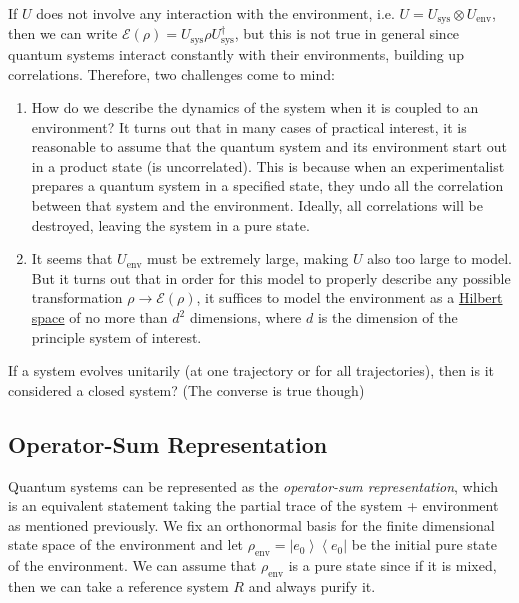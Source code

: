 \documentclass{article}
\newcommand{\ket}[1]{\ensuremath{\left|#1\right\rangle}}
\newcommand{\bra}[1]{\ensuremath{\left\langle#1\right|}}
\newcounter{question}[section]
\begin{document}
    If $U$ does not involve any interaction with the environment, i.e. $U = U_{\mathrm{sys}} \otimes U_{\mathrm{env}}$, then we can write $\mathcal{E} (\rho) = U_{\mathrm{sys}} \rho U_{\mathrm{sys}}^\dagger$, but this is not true in general since quantum systems interact constantly with their environments, building up correlations. Therefore, two challenges come to mind: 
    \begin{enumerate}
      \item How do we describe the dynamics of the system when it is coupled to an environment? It turns out that in many cases of practical interest, it is reasonable to assume that the quantum system and its environment start out in a product state (is uncorrelated). This is because when an experimentalist prepares a quantum system in a specified state, they undo all the correlation between that system and the environment. Ideally, all correlations will be destroyed, leaving the system in a pure state. 
      \item It seems that $U_{\mathrm{env}}$ must be extremely large, making $U$ also too large to model. But it turns out that in order for this model to properly describe any possible transformation $\rho \rightarrow \mathcal{E}(\rho)$, it suffices to model the environment as a \hyperref[fa-def:hilbert-space]{Hilbert space} of no more than $d^2$ dimensions, where $d$ is the dimension of the principle system of interest. 
    \end{enumerate}

    \begin{question}
      If a system evolves unitarily (at one trajectory or for all trajectories), then is it considered a closed system? (The converse is true though)
    \end{question}

  \subsection{Operator-Sum Representation} 

    Quantum systems can be represented as the \textit{operator-sum representation}, which is an equivalent statement taking the partial trace of the system + environment as mentioned previously. We fix an orthonormal basis for the finite dimensional state space of the environment and let $\rho_{\mathrm{env}} = \ket{e_0} \bra{e_0}$ be the initial pure state of the environment. We can assume that $\rho_{\mathrm{env}}$ is a pure state since if it is mixed, then we can take a reference system $R$ and always purify it. 
\end{document}
